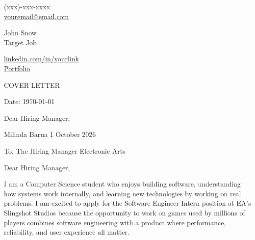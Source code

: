 \documentclass[11pt,a4]{article}
\begin{document}
\begin{center}
    \begin{minipage}[b]{0.24\textwidth}
            \large (xxx)-xxx-xxxx \\
            \large \href{mailto:youremail@email.com}{youremail@email.com} 
    \end{minipage}%
    \begin{minipage}[b]{0.5\textwidth}
            \centering
            {\Huge John Snow} \\ %
            \vspace{0.1cm}
            {\color{UI_blue} \Large{Target Job}} \\
    \end{minipage}%
    \begin{minipage}[b]{0.24\textwidth}
            \flushright \large
            {\href{https://www.linkedin.com/in/link/}{linkedin.com/in/yourlink} } \\
            \href{https://Add_your_portfolio_here_}{Portfolio}
    \end{minipage}   
    
\vspace{-0.15cm} 
{\color{UI_blue} \hrulefill}
\end{center}

\justify
\setlength{\parindent}{0pt}
\setlength{\parskip}{12pt}
\vspace{0.2cm}
\begin{center}
    {\color{UI_blue} \Large{COVER LETTER}}
\end{center}



Date: \today \par \vspace{-0.1cm}
Dear Hiring Manager, %

Milinda Barua
1 October 2026

To,
The Hiring Manager
Electronic Arts

Dear Hiring Manager,

I am a Computer Science student who enjoys building software, understanding how systems work internally, and learning new technologies by working on real problems. I am excited to apply for the Software Engineer Intern position at EA's Slingshot Studios because the opportunity to work on games used by millions of players combines software engineering with a product where performance, reliability, and user experience all matter.
\end{document}
